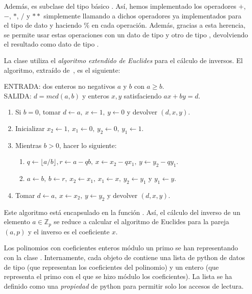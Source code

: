 Además,  es subclase del tipo básico . Así, hemos implementado los operadores $+$, $-$, $*$, $/$ y $**$ simplemente llamando a dichos operadores ya implementados para el tipo de dato  y haciendo $\%$ en cada operación. Además, gracias a esta herencia, se permite usar estas operaciones con un dato de tipo  y otro de tipo , devolviendo el resultado como dato de tipo .

La clase  utiliza el \emph{algoritmo extendido de Euclides} para el cálculo de inversos. El algoritmo, extraído de~\cite{Menezes:1996}, es el siguiente:
\begin{algoritmo2}
    ENTRADA: dos enteros no negativos $a$ y $b$ con $a \ge b$. \\
    SALIDA: $d = mcd(a, b)$ y enteros $x, y$ satisfaciendo $a x + b y = d$.
    \begin{enumerate}
        \item Si $b = 0$, tomar $d \leftarrow a, \ x \leftarrow 1, \ y \leftarrow 0$ y devolver $(d, x, y)$.
        \item Inicializar $x_2 \leftarrow 1, \ x_1 \leftarrow 0, \ y_2 \leftarrow 0,\ y_1 \leftarrow 1$.
        \item Mientras $b > 0$, hacer lo siguiente:
        \begin{enumerate}
            \item $q \leftarrow \lfloor a/b \rfloor, r \leftarrow a - q b, \ x \leftarrow x_2 - q x_1, \ y \leftarrow y_2 - q y_1$.
            \item $a \leftarrow b, \ b \leftarrow r, \ x_2 \leftarrow x_1, \ x_1 \leftarrow x, \ y_2 \leftarrow y_1$ y $y_1 \leftarrow y$.
        \end{enumerate}
        \item Tomar $d \leftarrow a, \ x \leftarrow x_2, \ y \leftarrow y_2$ y devolver $(d, x, y)$.
    \end{enumerate}
\end{algoritmo2}
Este algoritmo está encapsulado en la función . Así, el cálculo del inverso de un elemento $a \in \mathbb{Z}_p$ se reduce a calcular el algoritmo de Euclides para la pareja $(a, p)$ y el inverso es el coeficiente $x$.

Los polinomios con coeficientes enteros módulo un primo se han representando con la clase . Internamente, cada objeto de  contiene una lista de python de datos de tipo  (que representan los coeficientes del polinomio) y un entero (que representa el primo con el que se hizo módulo los coeficientes). La lista se ha definido como una \emph{propiedad} de python para permitir solo los accesos de lectura.


